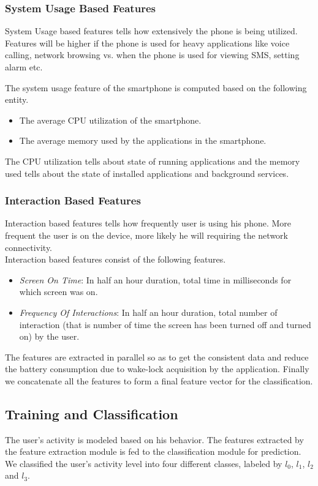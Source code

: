 \subsubsection{System Usage Based Features}
System Usage based
features tells how extensively the phone is being utilized.
Features will be higher if
the phone is used for heavy applications like voice calling, network browsing  vs. when the phone is used for viewing SMS, setting alarm etc.

The system usage feature of the smartphone is computed based on the
following entity.

\begin{itemize}
\item The average CPU utilization of the smartphone.
\item The average memory used by the applications in the smartphone.
\end{itemize}
The CPU utilization tells about state of running applications and the memory used tells about the state of installed applications and background services.

\subsubsection{Interaction Based Features}
Interaction based features
tells how frequently user is using his phone. More frequent the
user is on the device, more likely he will requiring the network
connectivity.\\
Interaction based features consist of the following features.
\begin{itemize}
\item \emph{Screen On Time}: In half an hour duration, total time in milliseconds
for which screen was on.
\item \emph{Frequency Of Interactions}: In half an hour duration, total number of interaction (that is number of time the screen has been turned off and turned on) by the user.
\end{itemize}
The features are extracted in parallel so as to get the
consistent data and reduce the battery consumption due to wake-lock acquisition by the application.
Finally we concatenate all the features to form a final feature vector for the classification.

\subsection{Training and Classification}
The user's activity is modeled based on his behavior.
The features extracted by the feature extraction
module is fed to the classification module for prediction.
We classified the user's activity level into four different classes,
labeled by $l_0$, $l_1$, $l_2$ and $l_3$.

